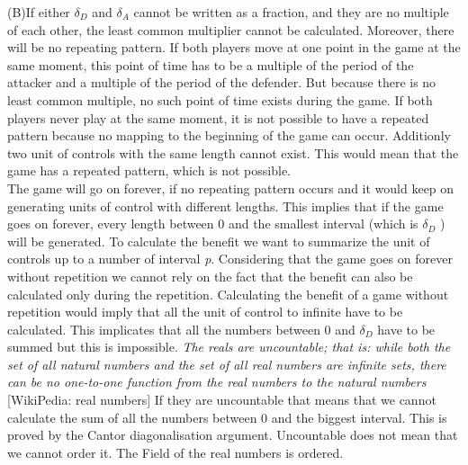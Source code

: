 (B)If either $\delta_{D}$ and $\delta_{A}$ cannot be written as a fraction, and they are no multiple of each other, the least common multiplier cannot be calculated. Moreover, there will be no repeating pattern. If both players move at one point in the game at the same moment, this point of time has to be a multiple of the period of the attacker and a multiple of the period of the defender. But because there is no least common multiple, no such point of time exists during the game. If both players never play at the same moment, it is not possible to have a repeated pattern because no mapping to the beginning of the game can occur. Additionly two unit of controls with the same length cannot exist. This would mean that the game has a repeated pattern, which is not possible.  \\
The game will go on forever, if no repeating pattern occurs and it would keep on generating units of control with different lengths. This implies that if the game goes on forever, every length between 0 and the smallest interval (which is $\delta_{D}$ ) will be generated.
To calculate the benefit we want to summarize the unit of controls up to a number of interval \textit{p}. Considering that the game goes on forever without repetition we cannot rely on the fact that the benefit can also be calculated only during the repetition. Calculating the benefit of a game without repetition would imply that all the unit of control to infinite have to be calculated. This implicates that all the numbers between 0 and   $\delta_{D}$ have to be summed but this is impossible. 
\textit{The reals are uncountable; that is: while both the set of all natural numbers and the set of all real numbers are infinite sets, there can be no one-to-one function from the real numbers to the natural numbers} [WikiPedia: real numbers] If they are uncountable that means that we cannot calculate the sum of all the numbers between 0 and the biggest interval. This is proved by the Cantor diagonalisation argument. Uncountable does not mean that we cannot order it. The Field of the real numbers is ordered. \\

